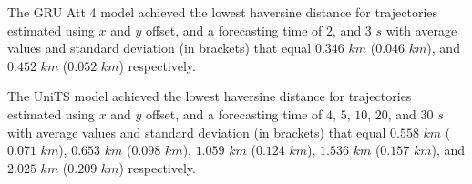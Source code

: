 The GRU Att 4 model achieved the lowest haversine distance for trajectories estimated using $x$ and $y$ offset, and a forecasting time of $2$, and $3$ $s$ with average values and standard deviation (in brackets) that equal $0.346$ $km$ ($0.046$ $km$), and $0.452$ $km$ ($0.052$ $km$) respectively.

The UniTS model achieved the lowest haversine distance for trajectories estimated using $x$ and $y$ offset, and a forecasting time of $4$, $5$, $10$, $20$, and $30$ $s$ with average values and standard deviation (in brackets) that equal $0.558$ $km$ ($0.071$ $km$), $0.653$ $km$ ($0.098$ $km$), $1.059$ $km$ ($0.124$ $km$), $1.536$ $km$ ($0.157$ $km$), and $2.025$ $km$ ($0.209$ $km$) respectively.

